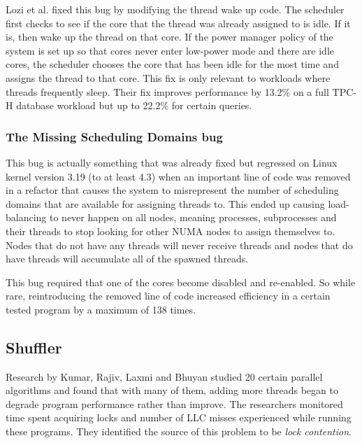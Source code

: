 \documentclass{sig-alternate}
\begin{document}
Lozi et al. fixed this bug by modifying the thread wake up code. The scheduler first checks to see if the core that the thread was already assigned to is idle. If it is, then wake up the thread on that core. If the power manager policy of the system is set up so that cores never enter low-power mode and there are idle cores, the scheduler chooses the core that has been idle for the most time and assigns the thread to that core. This fix is only relevant to workloads where threads frequently sleep. Their fix improves performance by 13.2\% on a full TPC-H database workload but up to 22.2\% for certain queries.~\cite{Lozi:2016}

\subsubsection{The Missing Scheduling Domains bug}
\label{sec:cfsfault_missingsched}

This bug is actually something that was already fixed but regressed on Linux kernel version 3.19 (to at least 4.3) when an important line of code was removed in a refactor that causes the system to misrepresent the number of scheduling domains that are available for assigning threads to. This ended up causing load-balancing to never happen on all nodes, meaning processes, subprocesses and their threads to stop looking for other NUMA nodes to assign themselves to. Nodes that do not have any threads will never receive threads and nodes that do have threads will accumulate all of the spawned threads.

This bug required that one of the cores become disabled and re-enabled. So while rare, reintroducing the removed line of code increased efficiency in a certain tested program by a maximum of 138 times.~\cite{Lozi:2016}

\subsection{Shuffler}
\label{sec:shuffler}

Research by Kumar, Rajiv, Laxmi and Bhuyan studied 20 certain parallel algorithms and found that with many of them, adding more threads began to degrade program performance rather than improve. The researchers monitored time spent acquiring locks and number of LLC misses experienced while running these programs. They identified the source of this problem to be \emph{lock contention}.
\end{document}
